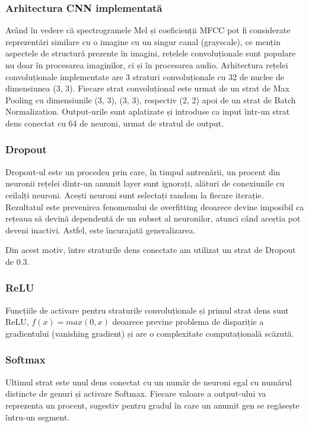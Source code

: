 \subsubsection{Arhitectura CNN implementată}

Având în vedere că spectrogramele Mel și coeficienții MFCC pot fi considerate reprezentări similare cu o
imagine cu un singur canal (grayscale), ce mențin aspectele de structură prezente în imagini, rețelele convoluționale
sunt populare nu doar în procesarea imaginilor, ci și în procesarea audio.
Arhitectura rețelei convoluționale implementate are 3 straturi convoluționale cu 32 de nuclee de dimensiunea (3, 3).
Fiecare strat convoluțional este urmat de un strat de Max Pooling cu dimensiunile (3, 3), (3, 3), respectiv (2, 2) apoi de
un strat de Batch Normalization. Output-urile sunt aplatizate și introduse ca input într-un strat dens conectat cu 64 de neuroni, urmat de
stratul de output.

\subsubsection{Dropout}
Dropout-ul este un procedeu prin care, în timpul antrenării, un procent din
neuronii rețelei dintr-un anumit layer sunt ignorați, alături de conexiunile
cu ceilalți neuroni. Acești neuroni sunt
selectați random la fiecare iterație. Rezultatul este prevenirea fenomenului
de overfitting deoarece devine imposibil ca rețeaua să devină dependentă
de un subset al neuronilor, atunci când aceștia pot deveni inactivi. Astfel,
este încurajată generalizarea. \cite{overfitting}

Din acest motiv, între straturile dens conectate am utilizat un strat de Dropout de 0.3.
\subsubsection{ReLU}
Funcțiile de activare pentru straturile convoluționale și primul strat dens sunt ReLU, $f(x) = max(0, x)$ deoarece
previne problema de dispariție a gradientului (vanishing gradient) și are o complexitate computațională scăzută.
\subsubsection{Softmax}
Ultimul strat este unul dens conectat cu un număr de neuroni egal cu numărul distincte de genuri și activare Softmax.
Fiecare valoare a output-ului va reprezenta un procent, sugestiv pentru gradul în care
un anumit gen se regăsește întru-un segment.

